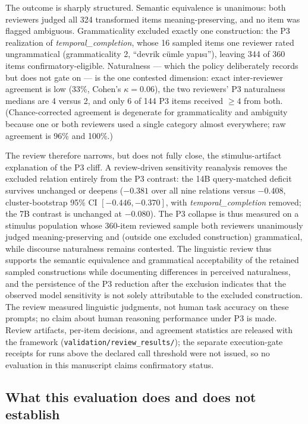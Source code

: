 The outcome is sharply structured. Semantic equivalence is unanimous: both reviewers judged all 324
transformed items meaning-preserving, and no item was flagged ambiguous. Grammaticality excluded exactly
one construction: the P3 realization of \emph{temporal\_completion}, whose 16 sampled items one reviewer
rated ungrammatical (grammaticality 2, ``devrik c\"umle yap\i{}s\i{}''), leaving 344 of 360 items
confirmatory-eligible. Naturalness --- which the policy deliberately records but does not gate on --- is
the one contested dimension: exact inter-reviewer agreement is low (33\%, Cohen's $\kappa = 0.06$), the
two reviewers' P3 naturalness medians are 4 versus 2, and only 6 of 144 P3 items received $\ge 4$ from
both. (Chance-corrected agreement is degenerate for grammaticality and ambiguity because one or both
reviewers used a single category almost everywhere; raw agreement is 96\% and 100\%.)

The review therefore narrows, but does not fully close, the stimulus-artifact explanation of the P3
cliff. A review-driven sensitivity reanalysis removes the excluded relation entirely from the P3
contrast: the 14B query-matched deficit survives unchanged or deepens ($-0.381$ over all nine relations
versus $-0.408$, cluster-bootstrap 95\% CI $[-0.446, -0.370]$, with \emph{temporal\_completion} removed;
the 7B contrast is unchanged at $-0.080$). The P3 collapse is thus measured on a stimulus population whose
360-item reviewed sample both reviewers unanimously judged meaning-preserving and (outside one excluded
construction) grammatical, while discourse naturalness remains contested. The linguistic review thus supports the
semantic equivalence and grammatical acceptability of the retained sampled constructions while documenting
differences in perceived naturalness, and the persistence of the P3 reduction after the exclusion
indicates that the observed model sensitivity is not solely attributable to the excluded construction. The
review measured linguistic judgments, not human task accuracy on these prompts; no claim about human
reasoning performance under P3 is made. Review artifacts,
per-item decisions, and agreement statistics are released with the framework
(\texttt{validation/review\_results/}); the separate execution-gate receipts for runs above the declared
call threshold were not issued, so no evaluation in this manuscript claims confirmatory status.

\subsection{What this evaluation does and does not establish}


